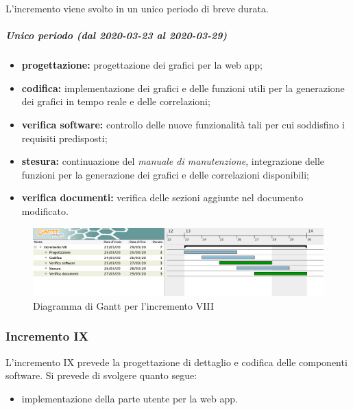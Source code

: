 				L'incremento viene svolto in un unico periodo di breve durata.
				
				\subparagraph{Unico periodo (dal 2020-03-23 al 2020-03-29)}
				
					\begin{itemize}
						\item \textbf{progettazione:} progettazione dei grafici per la web app;
						\item \textbf{codifica:} implementazione dei grafici e delle funzioni utili per la generazione dei grafici in tempo reale e delle correlazioni;
						\item \textbf{verifica software:} controllo delle nuove funzionalità tali per cui soddisfino i requisiti predisposti;
						\item \textbf{stesura:} continuazione del \textit{manuale di manutenzione}, integrazione delle funzioni per la generazione dei grafici e delle correlazioni disponibili;
						\item \textbf{verifica documenti:} verifica delle sezioni aggiunte nel documento modificato.
					\end{itemize} 			

		\begin{landscape}
          \begin{figure}[H]
            \centering
            \includegraphics[width=\linewidth]{images/gantt/incrementoVIII} %
            \caption{Diagramma di Gantt per l'incremento VIII}
          \end{figure}		
		\end{landscape}


		\subsubsection{Incremento IX}
			
			L'incremento IX prevede la progettazione di dettaglio e codifica delle componenti software. Si prevede di svolgere quanto segue:
			\begin{itemize}
				\item implementazione della parte utente per la web app.
			\end{itemize}
			
